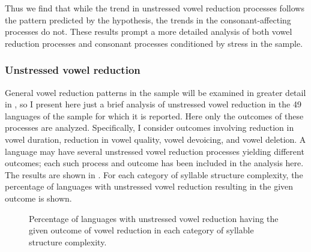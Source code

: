   Thus we find that while the trend in unstressed vowel reduction processes follows the pattern predicted by the hypothesis, the trends in the consonant-affecting processes do not. These results prompt a more detailed analysis of both vowel reduction processes and consonant processes conditioned by stress in the sample.

\subsubsection{{Unstressed} {vowel} {reduction}}\label{sec:5.4.3.1}

  General vowel reduction patterns in the sample will be examined in greater detail in , so I present here just a brief analysis of unstressed vowel reduction in the 49 languages of the sample for which it is reported. Here only the outcomes of these processes are analyzed. Specifically, I consider outcomes involving reduction in vowel duration, reduction in vowel quality, vowel devoicing, and vowel deletion. A language may have several unstressed vowel reduction processes yielding different outcomes; each such process and outcome has been included in the analysis here. The results are shown in . For each category of syllable structure complexity, the percentage of languages with unstressed vowel reduction resulting in the given outcome is shown.

\begin{figure}
\caption{\label{fig:5.3} Percentage of languages with unstressed vowel reduction having the given outcome of vowel reduction in each category of syllable structure complexity.}
\end{figure}

